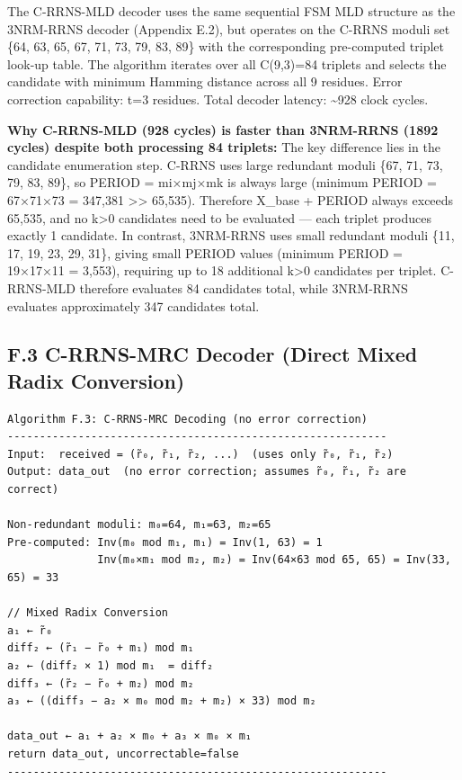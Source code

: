 \documentclass[
  12pt,
  a4paper]{report}
\begin{document}
The C-RRNS-MLD decoder uses the same sequential FSM MLD structure as the
3NRM-RRNS decoder (Appendix E.2), but operates on the C-RRNS moduli set
\{64, 63, 65, 67, 71, 73, 79, 83, 89\} with the corresponding
pre-computed triplet look-up table. The algorithm iterates over all
C(9,3)=84 triplets and selects the candidate with minimum Hamming
distance across all 9 residues. Error correction capability: t=3
residues. Total decoder latency: \textasciitilde928 clock cycles.

\textbf{Why C-RRNS-MLD (928 cycles) is faster than 3NRM-RRNS (1892
cycles) despite both processing 84 triplets:} The key difference lies in
the candidate enumeration step. C-RRNS uses large redundant moduli \{67,
71, 73, 79, 83, 89\}, so PERIOD = mi×mj×mk is always large (minimum
PERIOD = 67×71×73 = 347,381 \textgreater\textgreater{} 65,535).
Therefore X\_base + PERIOD always exceeds 65,535, and no k\textgreater0
candidates need to be evaluated --- each triplet produces exactly 1
candidate. In contrast, 3NRM-RRNS uses small redundant moduli \{11, 17,
19, 23, 29, 31\}, giving small PERIOD values (minimum PERIOD = 19×17×11
= 3,553), requiring up to 18 additional k\textgreater0 candidates per
triplet. C-RRNS-MLD therefore evaluates 84 candidates total, while
3NRM-RRNS evaluates approximately 347 candidates total.

\subsection{F.3 C-RRNS-MRC Decoder (Direct Mixed Radix
Conversion)}\label{f.3-c-rrns-mrc-decoder-direct-mixed-radix-conversion}

\begin{verbatim}
Algorithm F.3: C-RRNS-MRC Decoding (no error correction)
-----------------------------------------------------------
Input:  received = (r̃₀, r̃₁, r̃₂, ...)  (uses only r̃₀, r̃₁, r̃₂)
Output: data_out  (no error correction; assumes r̃₀, r̃₁, r̃₂ are correct)

Non-redundant moduli: m₀=64, m₁=63, m₂=65
Pre-computed: Inv(m₀ mod m₁, m₁) = Inv(1, 63) = 1
              Inv(m₀×m₁ mod m₂, m₂) = Inv(64×63 mod 65, 65) = Inv(33, 65) = 33

// Mixed Radix Conversion
a₁ ← r̃₀
diff₂ ← (r̃₁ − r̃₀ + m₁) mod m₁
a₂ ← (diff₂ × 1) mod m₁  = diff₂
diff₃ ← (r̃₂ − r̃₀ + m₂) mod m₂
a₃ ← ((diff₃ − a₂ × m₀ mod m₂ + m₂) × 33) mod m₂

data_out ← a₁ + a₂ × m₀ + a₃ × m₀ × m₁
return data_out, uncorrectable=false
-----------------------------------------------------------
\end{verbatim}
\end{document}
